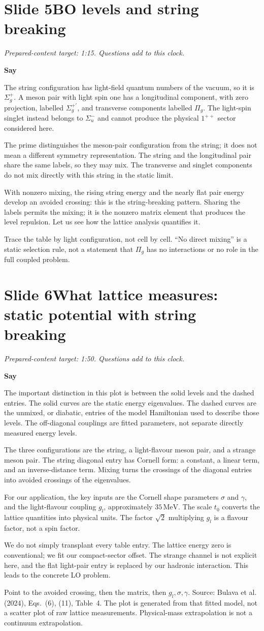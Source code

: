\documentclass[11pt,a4paper]{article}
\newcommand{\Sigmap}{\Sigma_g^{+\prime}}
\newcommand{\MeV}{\,\mathrm{MeV}}
\newcommand{\cue}[1]{\begin{private}#1\end{private}}
\newenvironment{speech}{\par\textbf{Say}\par}{\par}
\newcommand{\slidenote}[3]{%
  \clearpage
  \pdfbookmark[1]{Slide #1}{slide-#1}%
  \section*{Slide #1\quad #2}
  \textit{Prepared-content target: #3. Questions add to this clock.}\par
}
\begin{document}
\slidenote{5}{BO levels and string breaking}{1:15}
\begin{speech}
The string configuration has light-field quantum numbers of the vacuum,
so it is $\Sigma_g^+$. A meson pair with light spin one has a longitudinal
component, with zero projection, labelled $\Sigmap$, and transverse
components labelled $\Pi_g$. The light-spin singlet instead belongs to
$\Sigma_u^-$ and cannot produce the physical $1^{++}$ sector considered here.

The prime distinguishes the meson-pair configuration from the string;
it does not mean a different symmetry representation. The string and
the longitudinal pair share the same labels, so they may mix. The
transverse and singlet components do not mix directly with this string
in the static limit.

With nonzero mixing, the rising string energy and the nearly flat pair
energy develop an avoided crossing: this is the string-breaking pattern.
Sharing the labels permits the mixing; it is the nonzero matrix element
that produces the level repulsion. Let us see how the lattice analysis
quantifies it.
\end{speech}
\cue{Trace the table by light configuration, not cell by cell. ``No direct
mixing'' is a static selection rule, not a statement that $\Pi_g$ has no
interactions or no role in the full coupled problem.}

\slidenote{6}{What lattice measures: static potential with string breaking}{1:50}
\begin{speech}
The important distinction in this plot is between the solid levels and
the dashed entries. The solid curves are the static energy eigenvalues.
The dashed curves are the unmixed, or diabatic, entries of the model
Hamiltonian used to describe those levels. The off-diagonal couplings
are fitted parameters, not separate directly measured energy levels.

The three configurations are the string, a light-flavour meson pair,
and a strange meson pair. The string diagonal entry has Cornell form:
a constant, a linear term, and an inverse-distance term. Mixing turns
the crossings of the diagonal entries into avoided crossings of the
eigenvalues.

For our application, the key inputs are the Cornell shape parameters
$\sigma$ and $\gamma$, and the light-flavour coupling $g_l$, approximately
$35\MeV$. The scale $t_0$ converts the lattice quantities into physical
units. The factor $\sqrt2$ multiplying $g_l$ is a flavour factor, not a
spin factor.

We do not simply transplant every table entry. The lattice energy zero
is conventional; we fit our compact-sector offset. The strange channel
is not explicit here, and the flat light-pair entry is replaced by our
hadronic interaction. This leads to the concrete LO problem.
\end{speech}
\cue{Point to the avoided crossing, then the matrix, then $g_l,\sigma,\gamma$.
Source: Bulava et al. (2024), Eqs.~(6), (11), Table~4. The plot is generated
from that fitted model, not a scatter plot of raw lattice measurements.
Physical-mass extrapolation is not a continuum extrapolation.}
\end{document}
